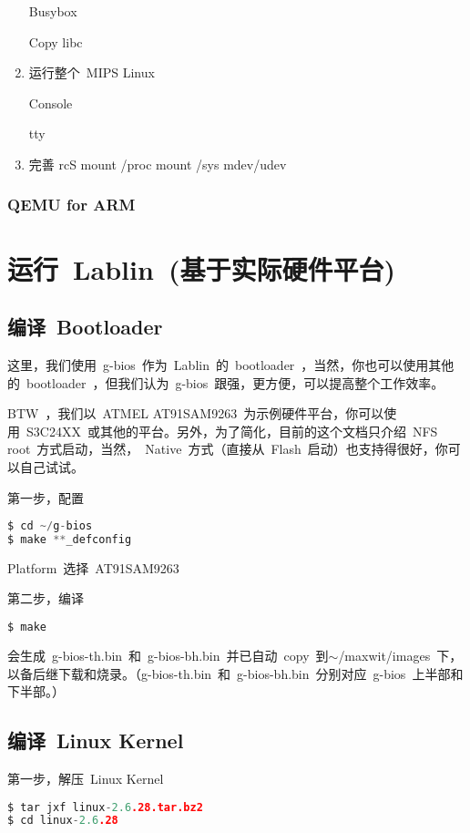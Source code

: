 \documentclass[a4paper,11pt]{article}
\begin{document}
\begin{CJK*}{UTF8}{gbsn}
\begin{enumerate}
Busybox

Copy libc

\item 运行整个~MIPS Linux~

Console

tty

\item 完善
rcS
mount /proc
mount /sys
mdev/udev
\end{enumerate}

\subsubsection{QEMU for ARM}

\section{运行~Lablin~(基于实际硬件平台)}
\subsection{编译~Bootloader~}

这里，我们使用~g-bios~作为~Lablin~的~bootloader~，当然，你也可以使用其他的~bootloader~，但我们认为~g-bios~跟强，更方便，可以提高整个工作效率。

BTW~，我们以~ATMEL AT91SAM9263~为示例硬件平台，你可以使用~S3C24XX~或其他的平台。另外，为了简化，目前的这个文档只介绍~NFS root~方式启动，当然，~Native~方式（直接从~Flash~启动）也支持得很好，你可以自己试试。

第一步，配置
\begin{lstlisting}[language=c,numbers=none]
$ cd ~/g-bios
$ make **_defconfig
\end{lstlisting}
Platform~选择~AT91SAM9263~

第二步，编译
\begin{lstlisting}[language=c,numbers=none]
$ make
\end{lstlisting}
会生成~g-bios-th.bin~和~g-bios-bh.bin~并已自动~copy~到$\sim$/maxwit/images~下，以备后继下载和烧录。（g-bios-th.bin~和~g-bios-bh.bin~分别对应~g-bios~上半部和下半部。）

\subsection{编译~Linux Kernel}
第一步，解压~Linux Kernel
\begin{lstlisting}[language=c,numbers=none]
$ tar jxf linux-2.6.28.tar.bz2
$ cd linux-2.6.28
\end{lstlisting}


\end{CJK*}
\end{document}
